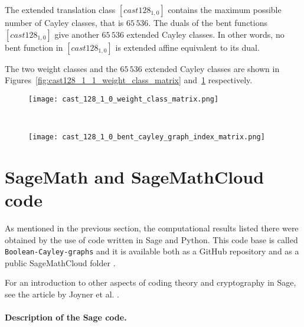 \documentclass[12pt,a4paper]{article}
\begin{document}
The extended translation class $[cast128_{1,0}]$ contains the maximum possible number of Cayley classes,
that is $65\,536$.
The duals of the bent functions $[cast128_{1,0}]$ give another $65\,536$ extended Cayley classes.
In other words, no bent function in $[cast128_{1,0}]$ is extended affine equivalent to its dual.

The two weight classes and the $65\,536$ extended Cayley classes are
shown in Figures~\ref{fig:cast128_1_1_weight_class_matrix} and~\ref{fig:cast_128_1_1_bent_cayley_graph_index_matrix} respectively.

\begin{figure}
\centering
\begin{minipage}{.48\textwidth}
  \centering

\texttt{[image: cast\_128\_1\_0\_weight\_class\_matrix.png]}
  \label{fig:cast128_1_1_weight_class_matrix}
\end{minipage}
~~
\begin{minipage}{.48\textwidth}
  \centering
\texttt{[image: cast\_128\_1\_0\_bent\_cayley\_graph\_index\_matrix.png]}
  \label{fig:cast_128_1_1_bent_cayley_graph_index_matrix}
\end{minipage}%
\end{figure}

\section{SageMath and Sage\-Math\-Cloud code}
\label{sec-Code}
As mentioned in the previous section, the computational results listed there were obtained by the
use of code written in Sage \cite{JoyEtAl13Sage} \cite{SageMath7517} and Python.
This code base is called \texttt{Boolean-Cayley-graphs} and it is available both as a GitHub
repository \cite{Leo16GitHub} and as a public Sage\-Math\-Cloud \cite{SageMathCloud} folder
\cite{Leo16SMC}.

For an introduction to other aspects of coding theory and cryptography in Sage,
see the article by Joyner et al. \cite{JoyEtAl13Sage}.

\paragraph*{Description of the Sage code.}
\end{document}
